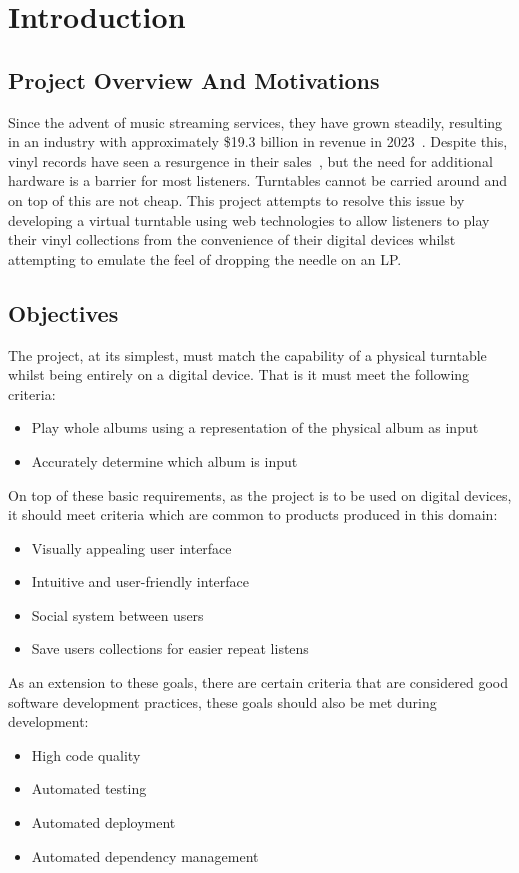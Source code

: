 \chapter{Introduction}\label{cha:intro}

\section{Project Overview And Motivations}
Since the advent of music streaming services, they have grown steadily, resulting in an industry with approximately \$19.3 billion in revenue in 2023~\cite{IFPI}. Despite this, vinyl records have seen a resurgence in their sales~\cite{BPI}, but the need for additional hardware is a barrier for most listeners. Turntables cannot be carried around and on top of this are not cheap. This project attempts to resolve this issue by developing a virtual turntable using web technologies to allow listeners to play their vinyl collections from the convenience of their digital devices whilst attempting to emulate the feel of dropping the needle on an LP.\@

\section{Objectives}\label{sec:objectives}
The project, at its simplest, must match the capability of a physical turntable whilst being entirely on a digital device. That is it must meet the following criteria:
\begin{itemize}
    \item Play whole albums using a representation of the physical album as input
    \item Accurately determine which album is input
\end{itemize}
On top of these basic requirements, as the project is to be used on digital devices, it should meet criteria which are common to products produced in this domain:
\begin{itemize}
    \item Visually appealing user interface
    \item Intuitive and user-friendly interface
    \item Social system between users
    \item Save users collections for easier repeat listens
\end{itemize}
As an extension to these goals, there are certain criteria that are considered good software development practices, these goals should also be met during development:
\begin{itemize}
    \item High code quality
    \item Automated testing
    \item Automated deployment
    \item Automated dependency management
\end{itemize}


